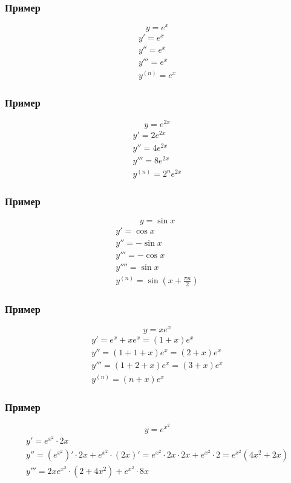 \documentclass{article}
\begin{document}
\subsubsection{Пример}
\[
    y = e^x 
\]
\begin{gather*}
    y'      = e^x \\
    y''     = e^x \\
    y'''    = e^x \\
    y^{(n)} = e^x
\end{gather*}

\subsubsection{Пример}
\[
    y = e^{2x} 
\]
\begin{gather*}
    y'      = 2e^{2x} \\
    y''     = 4e^{2x} \\
    y'''    = 8e^{2x} \\
    y^{(n)} = 2^n e^{2x}
\end{gather*}

\subsubsection{Пример}
\[
    y = \sin x
\]
\begin{gather*}
    y'      =  \cos x \\
    y''     = -\sin x \\
    y'''    = -\cos x \\
    y''''   =  \sin x \\
    y^{(n)} =  \sin \left( x + \frac{\pi n}{2} \right)
\end{gather*}

\subsubsection{Пример}
\[
    y = xe^x
\]
\begin{gather*}
    y'      = e^x + xe^x     = (1 + x)e^x \\
    y''     = (1 + 1 + x)e^x = (2 + x)e^x \\
    y'''    = (1 + 2 + x)e^x = (3 + x)e^x \\
    y^{(n)} = (n + x)e^x
\end{gather*}

\subsubsection{Пример}
\[
    y = e^{x^2}
\]
\begin{gather*}
    y'   = e^{x^2} \cdot 2x \\
    y''  = (e^{x^2})' \cdot 2x + e^{x^2} \cdot (2x)' =
    e^{x^2} \cdot 2x \cdot 2x + e^{x^2} \cdot 2 =
    e^{x^2} (4x^2 + 2x) \\
    y''' = 2xe^{x^2} \cdot (2 + 4x^2) + e^{x^2} \cdot 8x
\end{gather*}
\end{document}
